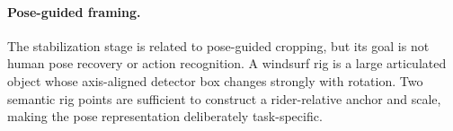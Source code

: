 \paragraph{Pose-guided framing.}
The stabilization stage is related to pose-guided cropping, but its goal is not human
pose recovery or action recognition.  A windsurf rig is a large articulated object
whose axis-aligned detector box changes strongly with rotation.  Two semantic rig
points are sufficient to construct a rider-relative anchor and scale, making the pose
representation deliberately task-specific.
